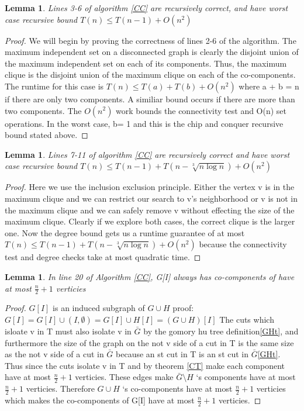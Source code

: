 \documentclass[12pt]{article}
\newtheorem{lem}[thm]{Lemma}
\begin{document}
\begin{lem}\label{small} Lines 3-6 of algorithm \ref{CC} are recursively correct, and have worst case recursive bound $T(n) \le T(n-1) + O(n^2)$ \end{lem}
\begin{proof} We will begin by proving the correctness of lines 2-6 of the algorithm. The maximum independent set on a disconnected graph is clearly the disjoint union of the maximum independent set on each of its components. Thus, the maximum clique  is the disjoint union of the maximum clique on each of the co-components. The runtime for this case is $T(n) \le T(a) + T(b) + O(n^2)$ where a + b = n if there are only two components.
A similiar bound occurs if there are more than two components. The $O(n^2)$ work bounds the connectivity test and O(n) set operations. In the worst case,  b= 1 and this is the chip and conquer recursive bound stated above.
\end{proof}
\begin{lem}\label{sparse} Lines 7-11 of algorithm \ref{CC} are recursively correct and have worst case recursive bound $T(n) \le T(n-1) + T(n-\sqrt[3]{n\log n}) + O(n^2)$ \end{lem}
\begin{proof}
Here we use the inclusion exclusion principle. Either the vertex v is in the maximum clique and we can restrict our search to v's neighborhood or v is not in the maximum clique and we can safely remove v without effecting the size of the maximum clique. Clearly if we explore both cases, the correct clique is the larger one. Now the degree bound gets us a runtime guarantee of at most $T(n) \le T(n-1) + T(n-\sqrt[3]{n\log n}) + O(n^2)$ because the connectivity test and degree checks take at most quadratic time. 
\end{proof}
\begin{lem} \label{size} In line 20 of Algorithm \ref{CC}, G[I] always has co-components of have at most $\frac{n}{2}+ 1$ verticies\end{lem}
\begin{proof}
$G[I]$ is an induced subgraph of $G\cup H$ proof: $G[I] = G[I] \cup (I,\emptyset) = G[I] \cup H[I] = (G \cup H) [I] $
 The cuts which isloate v in T must also isolate v in $\bar{G}$ by the gomory hu tree definition\ref{GHt}, and furthermore the size of the graph on the not v side of a cut in T is the same size as the not v side of a cut in $\bar{G}$ because an st cut in T is an st cut in $\bar{G}$\ref{GHt}. Thus since the cuts isolate v in T and by theorem \ref{CT} make each component have at most $\frac{n}{2}+ 1$ verticies. These edges make $\bar{G}\setminus H$ `s components have at most $\frac{n}{2}+ 1$ verticies. Therefore $G \cup H$ `s co-components have at most $\frac{n}{2}+ 1$ verticies which makes the co-components of G[I] have at most $\frac{n}{2}+ 1$ verticies.
\end{proof}
\end{document}

